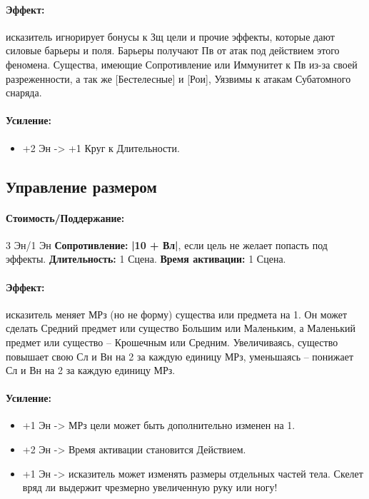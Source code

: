 \paragraph{Эффект: }исказитель игнорирует бонусы к Зщ цели и прочие эффекты, которые дают силовые барьеры и поля. Барьеры получают Пв от атак под действием этого феномена. Существа, имеющие Сопротивление или Иммунитет к Пв из-за своей разреженности, а так же [Бестелесные] и [Рои], Уязвимы к атакам Субатомного снаряда.
\paragraph{Усиление:}
\begin{itemize}
\item+2 Эн -> +1 Круг к Длительности.
\end{itemize}
\subsection{Управление размером}
\paragraph{} 
\textit{
\tbd}
\paragraph{Стоимость/Поддержание: }3 Эн/1 Эн
\newline
\textbf{Сопротивление: }
\textbf{|10 + Вл|}, если цель не желает попасть под эффекты.
\newline 
\textbf{Длительность: }1 Сцена.
\newline 
\textbf{Время активации: }1 Сцена.
\paragraph{Эффект: }исказитель меняет МРз (но не форму) существа или предмета на 1. Он может сделать Средний предмет или существо Большим или Маленьким, а Маленький предмет или существо – Крошечным или Средним. Увеличиваясь, существо повышает свою Сл и Вн на 2 за каждую единицу МРз, уменьшаясь – понижает Сл и Вн на 2 за каждую единицу МРз.
\paragraph{Усиление:}
\begin{itemize}
\item+1 Эн -> МРз цели может быть дополнительно изменен на 1.
\item+2 Эн -> Время активации становится Действием.
\item+1 Эн -> исказитель может изменять размеры отдельных частей тела. Скелет вряд ли выдержит чрезмерно увеличенную руку или ногу!
\end{itemize}
